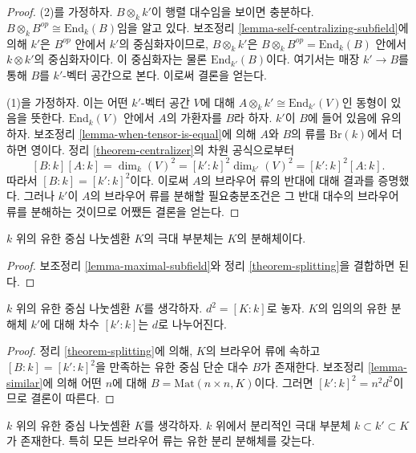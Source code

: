 \begin{proof}
(2)를 가정하자. $B \otimes_k k'$이 행렬 대수임을 보이면 충분하다.
$B \otimes_k B^{op} \cong \text{End}_k(B)$임을 알고 있다.
보조정리 \ref{lemma-self-centralizing-subfield}에 의해 $k'$은
$B^{op}$ 안에서 $k'$의 중심화자이므로, $B \otimes_k k'$은
$B \otimes_k B^{op} = \text{End}_k(B)$ 안에서 $k \otimes k'$의
중심화자이다. 이 중심화자는 물론 $\text{End}_{k'}(B)$이다. 여기서는 매장
$k' \to B$를 통해 $B$를 $k'$-벡터 공간으로 본다. 이로써 결론을 얻는다.

\medskip\noindent
(1)을 가정하자. 이는 어떤 $k'$-벡터 공간 $V$에 대해
$A \otimes_k k' \cong \text{End}_{k'}(V)$인 동형이 있음을 뜻한다.
$\text{End}_k(V)$ 안에서 $A$의 가환자를 $B$라 하자. $k'$이 $B$에
들어 있음에 유의하자. 보조정리 \ref{lemma-when-tensor-is-equal}에 의해
$A$와 $B$의 류를 $\text{Br}(k)$에서 더하면 영이다.
정리 \ref{theorem-centralizer}의 차원 공식으로부터
$$
[B : k] [A : k] =
\dim_k(V)^2 =
[k' : k]^2 \dim_{k'}(V)^2 =
[k' : k]^2 [A : k].
$$
따라서 $[B : k] = [k' : k]^2$이다. 이로써 $A$의 브라우어 류의 반대에
대해 결과를 증명했다. 그러나 $k'$이 $A$의 브라우어 류를 분해할
필요충분조건은 그 반대 대수의 브라우어 류를 분해하는 것이므로 어쨌든
결론을 얻는다.
\end{proof}

\begin{lemma}
\label{lemma-maximal-subfield-splits}
$k$ 위의 유한 중심 나눗셈환 $K$의 극대 부분체는 $K$의 분해체이다.
\end{lemma}

\begin{proof}
보조정리 \ref{lemma-maximal-subfield}와 정리 \ref{theorem-splitting}을
결합하면 된다.
\end{proof}

\begin{lemma}
\label{lemma-splitting-field-degree}
$k$ 위의 유한 중심 나눗셈환 $K$를 생각하자. $d^2 = [K : k]$로 놓자.
$K$의 임의의 유한 분해체 $k'$에 대해 차수 $[k' : k]$는 $d$로 나누어진다.
\end{lemma}

\begin{proof}
정리 \ref{theorem-splitting}에 의해, $K$의 브라우어 류에 속하고
$[B : k] = [k' : k]^2$을 만족하는 유한 중심 단순 대수 $B$가 존재한다.
보조정리 \ref{lemma-similar}에 의해 어떤 $n$에 대해
$B = \text{Mat}(n \times n, K)$이다. 그러면
$[k' : k]^2 = n^2d^2$이므로 결론이 따른다.
\end{proof}

\begin{proposition}
\label{proposition-separable-splitting-field}
$k$ 위의 유한 중심 나눗셈환 $K$를 생각하자. $k$ 위에서 분리적인
극대 부분체 $k \subset k' \subset K$가 존재한다.
특히 모든 브라우어 류는 유한 분리 분해체를 갖는다.
\end{proposition}

